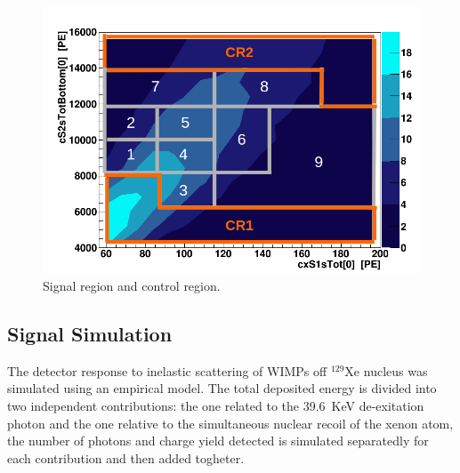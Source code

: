 \begin{figure}[t!]
  \includegraphics[width=\linewidth]{images/bkg_in_sr.png}
  \caption{Signal region and control region.}
  \label{fig:SR}
\end{figure}



\subsection{Signal Simulation} 
The detector response to inelastic scattering of WIMPs  off $^{129}$Xe nucleus was simulated using an empirical model.
The total deposited energy is divided into two independent contributions: the one related to the 39.6~KeV de-exitation photon and the one  relative to
the simultaneous nuclear recoil of the xenon atom, the number of photons and charge yield detected is simulated separatedly for each contribution
and then added togheter.

